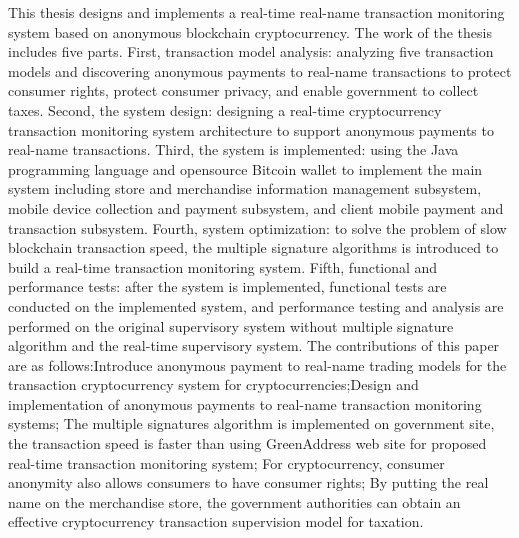\begin{eabstract}
	This thesis designs and implements a real-time real-name transaction monitoring system based on anonymous blockchain cryptocurrency. The work of the thesis includes five parts. First, transaction model analysis: analyzing five transaction models and discovering anonymous payments to real-name transactions to protect consumer rights, protect consumer privacy, and enable government to collect taxes. Second, the system design: designing a real-time cryptocurrency transaction monitoring system architecture to support anonymous payments to real-name transactions. Third, the system is implemented: using the Java programming language and opensource Bitcoin wallet to implement the main system including store and merchandise information management subsystem, mobile device collection and payment subsystem, and client mobile payment and transaction subsystem. Fourth, system optimization: to solve the problem of slow blockchain transaction speed, the multiple signature algorithms is introduced to build a real-time transaction monitoring system. Fifth, functional and performance tests: after the system is implemented, functional tests are conducted on the implemented system, and performance testing and analysis are performed on the original supervisory system without multiple signature algorithm and the real-time supervisory system.
	The contributions of this paper are as follows:Introduce anonymous payment to real-name trading models for the transaction cryptocurrency system for cryptocurrencies;Design and implementation of anonymous payments to real-name transaction monitoring systems; The multiple signatures algorithm is implemented on government site, the transaction speed is faster than using GreenAddress web site for proposed real-time transaction monitoring system; For cryptocurrency, consumer anonymity also allows consumers to have consumer rights; By putting the real name on the merchandise store, the government authorities can obtain an effective cryptocurrency transaction supervision model for taxation.

\end{eabstract}

